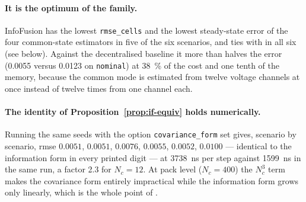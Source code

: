 \paragraph{It is the optimum of the family.} InfoFusion has the lowest \texttt{rmse\_cells} and
the lowest steady-state error of the four common-state estimators in five of the six scenarios,
and ties with  in all six (see below). Against the decentralised baseline it
more than halves the error (\num{0.0055} versus \num{0.0123} on \texttt{nominal}) at \SI{38}{\percent} of
the cost and one tenth of the memory, because the common mode is estimated from twelve voltage
channels at once instead of twelve times from one channel each.

\paragraph{The identity of Proposition~\ref{prop:if-equiv} holds numerically.} Running the same
seeds with the option \texttt{covariance\_form} set gives, scenario by scenario, rmse
$\num{0.0051}$, $\num{0.0051}$, $\num{0.0076}$, $\num{0.0055}$, $\num{0.0052}$, $\num{0.0100}$
--- identical to
the information form in every printed digit --- at \SI{3738}{\nano\second} per step against
\SI{1599}{\nano\second} in the same run, a factor \num{2.3} for $N_c=12$. At pack level
($N_c=400$) the $N_c^3$ term makes the covariance form entirely impractical while the information
form grows only linearly, which is the whole point of \cite{mutambara1998,grime1994decentralized}.

